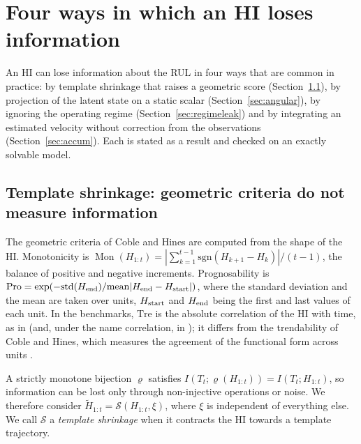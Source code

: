 \documentclass[preprint,12pt]{elsarticle}
\theoremstyle{definition}
\DeclareMathOperator{\Mon}{Mon}
\begin{document}
\section{Four ways in which an HI loses information}
\label{sec:losses}
An HI can lose information about the RUL in four ways that are common in practice: by template shrinkage that raises a geometric score (Section~\ref{sec:paradox}), by projection of the latent state on a static scalar (Section~\ref{sec:angular}), by ignoring the operating regime (Section~\ref{sec:regimeleak}) and by integrating an estimated velocity without correction from the observations (Section~\ref{sec:accum}). Each is stated as a result and checked on an exactly solvable model.

\subsection{Template shrinkage: geometric criteria do not measure information}
\label{sec:paradox}
The geometric criteria of Coble and Hines \cite{coble2009} are computed from the shape of the HI. Monotonicity is $\Mon(H_{1:t})=|\sum_{k=1}^{t-1}\mathrm{sgn}(H_{k+1}-H_k)|/(t-1)$, the balance of positive and negative increments. Prognosability is $\mathrm{Pro}=\exp(-\mathrm{std}(H_{\rm end})/\mathrm{mean}|H_{\rm end}-H_{\rm start}|)$, where the standard deviation and the mean are taken over units, $H_{\rm start}$ and $H_{\rm end}$ being the first and last values of each unit. In the benchmarks, $\mathrm{Tre}$ is the absolute correlation of the HI with time, as in \cite{javed2013} (and, under the name correlation, in \cite{zhang2016}); it differs from the trendability of Coble and Hines, which measures the agreement of the functional form across units \cite{coble2009}.

A strictly monotone bijection $\varrho$ satisfies $I(T_t;\varrho(H_{1:t}))=I(T_t;H_{1:t})$, so information can be lost only through non-injective operations or noise. We therefore consider $\tilde H_{1:t}=\mathcal S(H_{1:t},\xi)$, where $\xi$ is independent of everything else. We call $\mathcal S$ a \emph{template shrinkage} when it contracts the HI towards a template trajectory.
\end{document}
